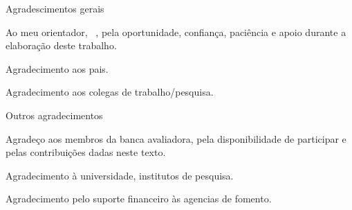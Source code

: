 
\begin{agradecimentos}

Agradescimentos gerais

Ao meu orientador, \insereorientadorTitulo~\insereorientador, pela oportunidade, confiança, paciência e apoio durante a elaboração deste trabalho.

Agradecimento aos pais.

Agradecimento aos colegas de trabalho/pesquisa. 

Outros agradecimentos

Agradeço aos membros da banca avaliadora, pela disponibilidade de participar e pelas contribuições dadas neste texto.

Agradecimento à universidade, institutos de pesquisa.

Agradecimento pelo suporte financeiro às agencias de fomento.

\end{agradecimentos}